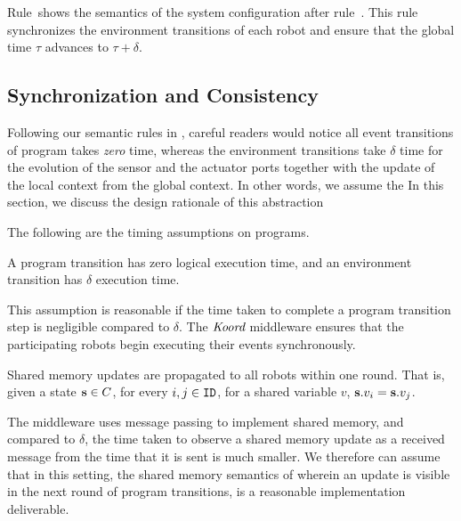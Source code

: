 Rule~\EnvTransRule shows the semantics of the system configuration after rule~\EndProgTransRule.
This rule synchronizes the environment transitions of each robot and
ensure that the global time $\tau$ advances to $\tau + \delta$.


\subsection{Synchronization and Consistency}
\label{sec:sync}

Following our semantic rules in ,
careful readers would notice all event transitions of \lgname program takes \emph{zero} time,
whereas the environment transitions take $\delta$ time for the evolution of the sensor and the actuator ports
together with the update of the local context from the global context.
In other words, we assume the 
In this section, we discuss the design rationale of this abstraction

%


The following are the timing assumptions on \lgname programs.
\begin{assumption}
    A program transition has zero logical execution time, and an environment transition has $\delta$ execution time.
\end{assumption}
This assumption is reasonable if the time taken to complete a program transition step is negligible compared to $\delta$.  The $\emph{Koord}$ middleware ensures that the participating robots begin executing their events synchronously.

\begin{assumption}
    \label{shared}
    Shared memory updates are propagated to all robots within one round. That is, given a state ${\textbf{s}}\in C$, for every  $i,j \in \texttt{ID}$, for a shared variable $v$, ${\textbf{s}}.v_i = {\textbf{s}}.v_j$.
\end{assumption}
The \lgname middleware uses message passing to implement shared memory, and compared to $\delta$, the time taken to observe a shared memory update as a received message from the time that it is sent is much smaller. We therefore can assume that in this setting, the shared memory semantics of \lgname wherein an update is visible in the next round of program transitions, is a reasonable implementation deliverable.

